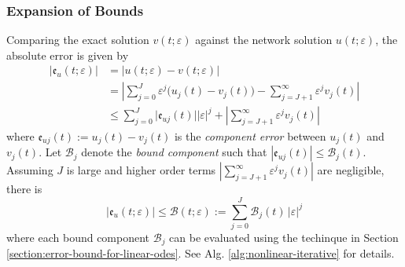 \documentclass[accepted]{uai2023}
\newcommand{\Err}{\mathfrak{e}}
\newcommand{\Bound}{\mathcal{B}}
\begin{document}
\subsubsection{Expansion of Bounds}
    Comparing the exact solution $v(t; \varepsilon)$ against the network solution $u(t; \varepsilon)$, the absolute error is given by 
    {
        \small
        \begin{align}
            |\Err_u(t; \varepsilon)| &= \big|u(t; \varepsilon) - v(t; \varepsilon)\big| \nonumber \\[-0.25em]
            &= \left|\sum_{j=0}^{J} \varepsilon^{j} \Big(u_j(t) - v_j(t)\Big) - \sum_{j=J+1}^{\infty} \varepsilon^j v_j(t)\right| \nonumber \\[-0.5em]
            &\leq \sum_{j=0}^{J} \Big|\Err_{uj}(t)\Big||\varepsilon|^j + \left|\sum_{j=J+1}^{\infty}\varepsilon^j v_j(t)\right| 
        \end{align}
    }
    where $\Err_{uj}(t) := u_j(t) - v_j(t)$ is the \textit{component error} between $u_j(t)$ and $v_j(t)$.
    Let $\Bound_{j}$ denote the \textit{bound component} such that $|\Err_{uj}(t)| \leq \Bound_j(t)$.
    Assuming $J$ is large and higher order terms $\left|\sum_{j=J+1}^{\infty}\varepsilon^j v_j(t)\right|$ are negligible, there is 
    {
        \small
        \begin{equation} \label{eq:nonlinear-bound-components}
            \Big|\Err_u(t; \varepsilon)\Big| \leq \Bound(t; \varepsilon) := \sum_{j=0}^{J} \Bound_j(t)\,|\varepsilon|^j 
        \end{equation}
    }
    where each bound component $\Bound_j$ can be evaluated using the techinque in Section \ref{section:error-bound-for-linear-odes}. 
    See Alg. \ref{alg:nonlinear-iterative} for details.
\end{document}
